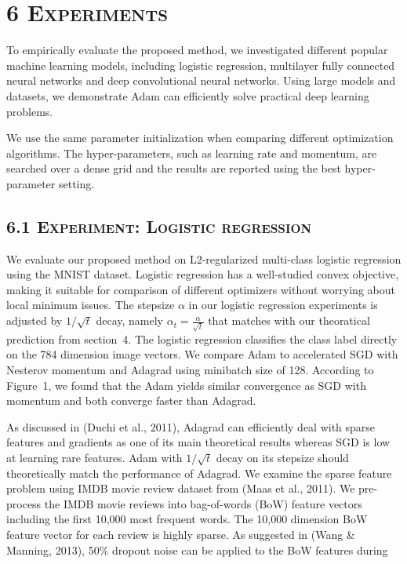 \documentclass[11pt]{article}
\begin{document}
\vspace{0.5em}

\section*{6 \textsc{Experiments}}

To empirically evaluate the proposed method, we investigated
different popular machine learning models, including logistic
regression, multilayer fully connected neural networks and deep
convolutional neural networks. Using large models and datasets,
we demonstrate Adam can efficiently solve practical deep learning
problems.

We use the same parameter initialization when comparing different
optimization algorithms. The hyper-parameters, such as learning
rate and momentum, are searched over a dense grid and the results
are reported using the best hyper-parameter setting.

\subsection*{6.1 \textsc{Experiment: Logistic regression}}

We evaluate our proposed method on L2-regularized multi-class
logistic regression using the MNIST dataset. Logistic regression
has a well-studied convex objective, making it suitable for
comparison of different optimizers without worrying about local
minimum issues. The stepsize $\alpha$ in our logistic regression
experiments is adjusted by $1/\sqrt{t}$ decay, namely
$\alpha_t = \frac{\alpha}{\sqrt{t}}$ that matches with our
theoratical prediction from section~4. The logistic regression
classifies the class label directly on the 784 dimension image
vectors. We compare Adam to accelerated SGD with Nesterov
momentum and Adagrad using minibatch size of 128. According to
Figure~1, we found that the Adam yields similar convergence as
SGD with momentum and both converge faster than Adagrad.

As discussed in (Duchi et al., 2011), Adagrad can efficiently
deal with sparse features and gradients as one of its main
theoretical results whereas SGD is low at learning rare features.
Adam with $1/\sqrt{t}$ decay on its stepsize should theoretically
match the performance of Adagrad. We examine the sparse feature
problem using IMDB movie review dataset from (Maas et al., 2011).
We pre-process the IMDB movie reviews into bag-of-words (BoW)
feature vectors including the first 10,000 most frequent words.
The 10,000 dimension BoW feature vector for each review is highly
sparse. As suggested in (Wang \& Manning, 2013), 50\% dropout
noise can be applied to the BoW features during

\end{document}
